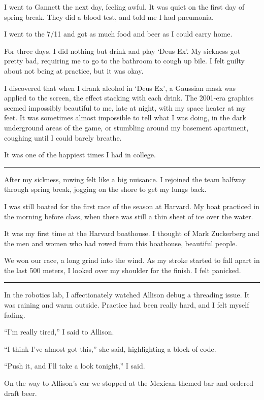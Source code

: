 I went to Gannett the next day, feeling awful.  It was quiet on the first day of
spring break.  They did a blood test, and told me I had pneumonia.

I went to the 7/11 and got as much food and beer as I could carry home.

For three days, I did nothing but drink and play `Deus Ex'.  My sickness got
pretty bad, requiring me to go to the bathroom to cough up bile.  I felt guilty
about not being at practice, but it was okay.   

I discovered that when I drank alcohol in `Deus Ex', a Gaussian mask was applied
to the screen, the effect stacking with each drink.  The 2001-era graphics
seemed impossibly beautiful to me, late at night, with my space heater at my
feet.  It was sometimes almost impossible to tell what I was doing, in the dark
underground areas of the game, or stumbling around my basement apartment,
coughing until I could barely breathe.

It was one of the happiest times I had in college.

\plainfancybreak{12pt}{2}{}

After my sickness, rowing felt like a big nuisance.  I rejoined the team halfway
through spring break, jogging on the shore to get my lungs back.  

I was still boated for the first race of the season at Harvard.  My boat
practiced in the morning before class, when there was still a thin sheet of ice
over the water.

It was my first time at the Harvard boathouse.  I thought of Mark Zuckerberg and
the men and women who had rowed from this boathouse, beautiful people. 

We won our race, a long grind into the wind.  As my stroke started to fall apart
in the last 500 meters, I looked over my shoulder for the finish.  I felt
panicked.

\plainfancybreak{12pt}{2}{}

In the robotics lab, I affectionately watched Allison debug a threading issue.
It was raining and warm outside.  Practice had been really hard, and I felt
myself fading.

``I'm really tired,'' I said to Allison.

``I think I've almost got this,'' she said, highlighting a block of code.

``Push it, and I'll take a look tonight,'' I said.

On the way to Allison's car we stopped at the Mexican-themed bar and ordered
draft beer.

